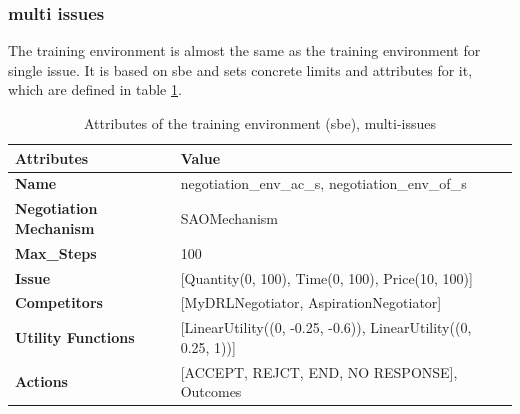 \subsubsection{multi issues}
The training environment is almost the same as the training environment for single issue. It is based on \gls{sbe} and sets concrete limits and attributes for it, which are defined in table \ref{tab:attributes-sbe-multi-issues}.

\begin{table}[htbp]
\centering
\begin{tabular}{l l l} \toprule
\bfseries \textbf{Attributes}      & \bfseries \textbf{Value}             \\ \midrule
\textbf{Name}                    & negotiation\_env\_ac\_s, negotiation\_env\_of\_s                     \\
\textbf{Negotiation Mechanism}   & SAOMechanism                                                         \\
\textbf{Max\_Steps}              & 100                                                                  \\
\textbf{Issue}             	     & [Quantity(0, 100), Time(0, 100), Price(10, 100)]                     \\
\textbf{Competitors}             & [MyDRLNegotiator, AspirationNegotiator]                              \\
\textbf{Utility Functions}       & [LinearUtility((0, -0.25, -0.6)), LinearUtility((0, 0.25, 1))]       \\
\textbf{Actions}                 & [ACCEPT, REJCT, END, NO RESPONSE], Outcomes                                 \\
\bottomrule
\end{tabular}
\caption{Attributes of the training environment (sbe), multi-issues}
\label{tab:attributes-sbe-multi-issues}
\end{table}


